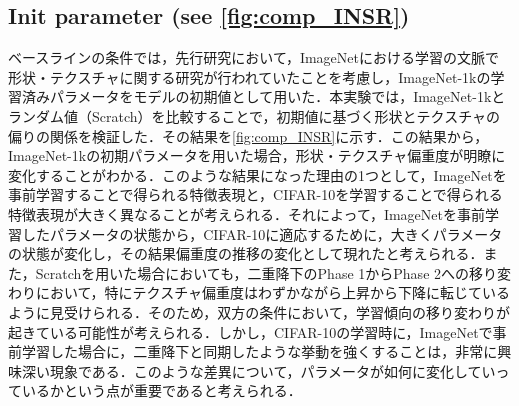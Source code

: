 \newpage

\subsection[Init parameter]{Init parameter (see \cref{fig:comp_INSR})}
ベースラインの条件では，先行研究において，ImageNetにおける学習の文脈で形状・テクスチャに関する研究が行われていたことを考慮し，ImageNet-1kの学習済みパラメータをモデルの初期値として用いた．本実験では，ImageNet-1kとランダム値（Scratch）を比較することで，初期値に基づく形状とテクスチャの偏りの関係を検証した．その結果を\cref{fig:comp_INSR}に示す．この結果から，ImageNet-1kの初期パラメータを用いた場合，形状・テクスチャ偏重度が明瞭に変化することがわかる．このような結果になった理由の1つとして，ImageNetを事前学習することで得られる特徴表現と，CIFAR-10を学習することで得られる特徴表現が大きく異なることが考えられる．それによって，ImageNetを事前学習したパラメータの状態から，CIFAR-10に適応するために，大きくパラメータの状態が変化し，その結果偏重度の推移の変化として現れたと考えられる．また，Scratchを用いた場合においても，二重降下のPhase 1からPhase 2への移り変わりにおいて，特にテクスチャ偏重度はわずかながら上昇から下降に転じているように見受けられる．そのため，双方の条件において，学習傾向の移り変わりが起きている可能性が考えられる．しかし，CIFAR-10の学習時に，ImageNetで事前学習した場合に，二重降下と同期したような挙動を強くすることは，非常に興味深い現象である．このような差異について，パラメータが如何に変化していっているかという点が重要であると考えられる．

